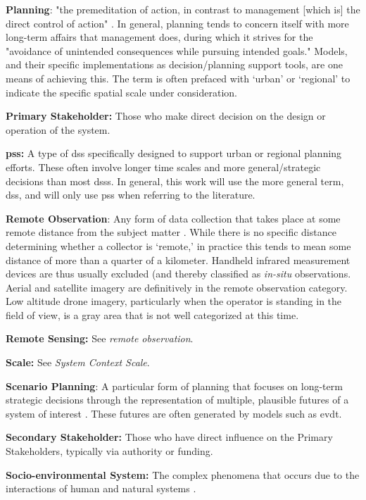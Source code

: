 \textbf{Planning}: "the premeditation of action, in contrast to management [which is] the direct control of action" \cite{harrisLocationalModelsGeographic1993}. In general, planning tends to concern itself with more long-term affairs that management does, during which it strives for the "avoidance of unintended consequences while pursuing intended goals." Models, and their specific implementations as decision/planning support tools, are one means of achieving this. The term is often prefaced with `urban' or `regional' to indicate the specific spatial scale under consideration.

\textbf{Primary Stakeholder:} Those who make direct decision on the design or operation of the system.

\textbf{\acf{pss}:} A type of \ac{dss} specifically designed to support urban or regional planning efforts. These often involve longer time scales and more general/strategic decisions than most \acp{dss}. In general, this work will use the more general term, \ac{dss}, and will only use \ac{pss} when referring to the literature.

\textbf{Remote Observation}: Any form of data collection that takes place at some remote distance from the subject matter \cite{jensenRemoteSensingEnvironment2006}. While there is no specific distance determining whether a collector is `remote,' in practice this tends to mean some distance of more than a quarter of a kilometer. Handheld infrared measurement devices are thus usually excluded (and thereby classified as \textit{in-situ} observations. Aerial and satellite imagery are definitively in the remote observation category. Low altitude drone imagery, particularly when the operator is standing in the field of view, is a gray area that is not well categorized at this time.

\textbf{Remote Sensing:} See \textit{remote observation}.

\textbf{Scale:} See \textit{System Context Scale}.

\textbf{Scenario Planning}: A particular form of planning that focuses on long-term strategic decisions through the representation of multiple, plausible futures of a system of interest \cite{goodspeedScenarioPlanningCities2020}. These futures are often generated by models such as \ac{evdt}.

\textbf{Secondary Stakeholder:} Those who have direct influence on the Primary Stakeholders, typically via authority or funding.

\textbf{Socio-environmental System:} The complex phenomena that occurs due to the interactions of human and natural systems \cite{elsawahEightGrandChallenges2020}.

